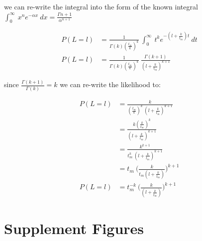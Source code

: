 \documentclass[11pt]{article}
\begin{document}
 
we can re-write the integral into the  form of the known integral $\int_{0}^{\infty}\ x^n e^{-\alpha x} \ dx= \frac{\Gamma{n+1}}{\alpha^{n+1}}$

\begin{equation}
\begin{split}
\label{eq:Likelihood_function_extended_pulse_3}
    P(L=l) &= \frac{1}{\Gamma(k)(\frac{t_m}{k})^k}\ \int_{0}^{\infty}\ t^{k}e^{-(l+\frac{k}{t_m})t} \ dt \\ 
    P(L=l) &= \frac{1}{\Gamma(k)(\frac{t_m}{k})^k}\ \frac{\Gamma(k+1)}{(l+\frac{k}{t_m})^{k+1}} 
\end{split}
\end{equation}

since $\frac{\Gamma(k+1)}{\Gamma(k)} =k$ we can re-write the likelihood to:



\begin{equation}
\begin{split}
\label{eq:Likelihood_function_extended_pulse_final}
    P(L=l) &= \frac{k}{(\frac{t_m}{k})^k \ (l+\frac{k}{t_m})^{k+1}} \\
    &= \frac{k(\frac{k}{t_m})^k} {(l+\frac{k}{t_{m}})^{k+1}}  \\
    &= \frac{k^{k+1}} { t_{m}^k \ (l+\frac{k}{t_{m}})^{k+1}}  \\
    &= t_{m} \ \Bigg( \frac{k}{t_{m}(l+\frac{k}{t_{m}})}\Bigg)^{k+1} \\
    P(L=l) &= t_{m}^{-k} \ \Bigg( \frac{k}{(l+\frac{k}{t_{m}})}\Bigg)^{k+1}
\end{split}
\end{equation}


\section{Supplement Figures}
\end{document}
